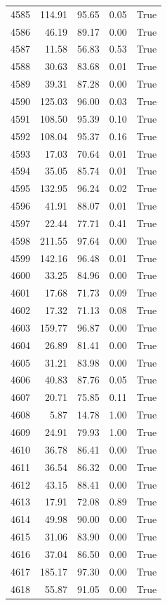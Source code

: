 \begin{longtable}{rrrrr}
4585 & 114.91 & 95.65 & 0.05 & True \\
4586 & 46.19 & 89.17 & 0.00 & True \\
4587 & 11.58 & 56.83 & 0.53 & True \\
4588 & 30.63 & 83.68 & 0.01 & True \\
4589 & 39.31 & 87.28 & 0.00 & True \\
4590 & 125.03 & 96.00 & 0.03 & True \\
4591 & 108.50 & 95.39 & 0.10 & True \\
4592 & 108.04 & 95.37 & 0.16 & True \\
4593 & 17.03 & 70.64 & 0.01 & True \\
4594 & 35.05 & 85.74 & 0.01 & True \\
4595 & 132.95 & 96.24 & 0.02 & True \\
4596 & 41.91 & 88.07 & 0.01 & True \\
4597 & 22.44 & 77.71 & 0.41 & True \\
4598 & 211.55 & 97.64 & 0.00 & True \\
4599 & 142.16 & 96.48 & 0.01 & True \\
4600 & 33.25 & 84.96 & 0.00 & True \\
4601 & 17.68 & 71.73 & 0.09 & True \\
4602 & 17.32 & 71.13 & 0.08 & True \\
4603 & 159.77 & 96.87 & 0.00 & True \\
4604 & 26.89 & 81.41 & 0.00 & True \\
4605 & 31.21 & 83.98 & 0.00 & True \\
4606 & 40.83 & 87.76 & 0.05 & True \\
4607 & 20.71 & 75.85 & 0.11 & True \\
4608 & 5.87 & 14.78 & 1.00 & True \\
4609 & 24.91 & 79.93 & 1.00 & True \\
4610 & 36.78 & 86.41 & 0.00 & True \\
4611 & 36.54 & 86.32 & 0.00 & True \\
4612 & 43.15 & 88.41 & 0.00 & True \\
4613 & 17.91 & 72.08 & 0.89 & True \\
4614 & 49.98 & 90.00 & 0.00 & True \\
4615 & 31.06 & 83.90 & 0.00 & True \\
4616 & 37.04 & 86.50 & 0.00 & True \\
4617 & 185.17 & 97.30 & 0.00 & True \\
4618 & 55.87 & 91.05 & 0.00 & True \\

\end{longtable}
